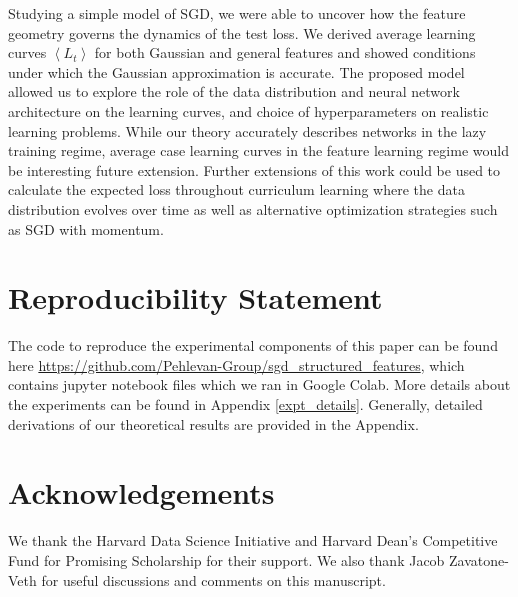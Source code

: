 \documentclass{article} %
\begin{document}
Studying a simple model of SGD, we were able to uncover how the feature geometry governs the dynamics of the test loss. We derived average learning curves $\left< L_t \right>$ for both Gaussian and general features and showed conditions under which the Gaussian approximation is accurate. The proposed model allowed us to explore the role of the data distribution and neural network architecture on the learning curves, and choice of hyperparameters on realistic learning problems. While our theory accurately describes networks in the lazy training regime, average case learning curves in the feature learning regime would be interesting future extension. Further extensions of this work could be used to calculate the expected loss throughout curriculum learning where the data distribution evolves over time as well as alternative optimization strategies such as SGD with momentum. 


\section*{Reproducibility Statement}

The code to reproduce the experimental components of this paper can be found here \url{https://github.com/Pehlevan-Group/sgd_structured_features}, which contains jupyter notebook files which we ran in Google Colab. More details about the experiments can be found in Appendix \ref{expt_details}. Generally, detailed derivations of our theoretical results are provided in the Appendix. 

\section*{Acknowledgements}
We thank the Harvard Data Science Initiative and Harvard Dean’s Competitive Fund for Promising Scholarship for their support. We also thank Jacob Zavatone-Veth for useful discussions and comments on this manuscript.





\pagebreak

\appendix

\end{document}
